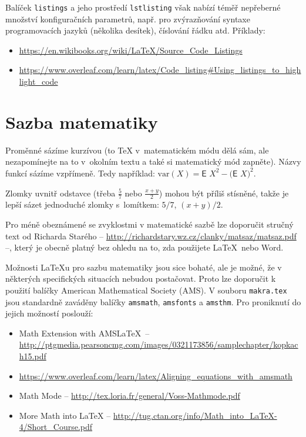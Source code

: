 Balíček \texttt{listings} a jeho prostředí \texttt{lstlisting} však nabízí téměř nepřeberné množství konfiguračních parametrů, např. pro zvýrazňování syntaxe programovacích jazyků (několika desítek), číslování řádku atd. Příklady:
\begin{itemize}
\item \url{https://en.wikibooks.org/wiki/LaTeX/Source_Code_Listings}
\item \url{https://www.overleaf.com/learn/latex/Code_listing#Using_listings_to_highlight_code}
\end{itemize}


\section{Sazba matematiky}
Proměnné sázíme kurzívou (to \TeX{} v~matematickém módu dělá sám, ale
nezapomínejte na to v~okolním textu a také si matematický mód zapněte).
Názvy funkcí sázíme vzpřímeně. Tedy například:
$\textrm{var} (X) = \textsf{E~} X^2 - \bigl(\textsf{E~} X \bigr)^2$.

Zlomky uvnitř odstavce (třeba $\frac{5}{7}$ nebo $\frac{x+y}{2}$) mohou
být příliš stísněné, takže je lepší sázet jednoduché zlomky s~lomítkem:
$5/7$, $(x+y)/2$.

Pro méně obeznámené se zvyklostmi v matematické sazbě lze doporučit stručný text od Richarda Starého -- \url{http://richardstary.wz.cz/clanky/matsaz/matsaz.pdf} --, který je obecně platný bez ohledu na to, zda použijete \LaTeX\ nebo Word.

Možnosti \LaTeX u pro sazbu matematiky jsou sice bohaté, ale je možné, že v některých specifických situacích nebudou postačovat. Proto lze doporučit k použití balíčky American Mathematical Society (AMS). V souboru \texttt{makra.tex} jsou standardně zaváděny balíčky \texttt{amsmath}, \texttt{amsfonts} a \texttt{amsthm}. Pro proniknutí do jejich možností poslouží:
\begin{itemize}
\item Math Extension with AMS\LaTeX\ -- \url{http://ptgmedia.pearsoncmg.com/images/0321173856/samplechapter/kopkach15.pdf}
\item \url{https://www.overleaf.com/learn/latex/Aligning_equations_with_amsmath}
\item Math Mode -- \url{http://tex.loria.fr/general/Voss-Mathmode.pdf}
\item More Math into LaTeX -- \url{http://tug.ctan.org/info/Math_into_LaTeX-4/Short_Course.pdf}
\end{itemize}

